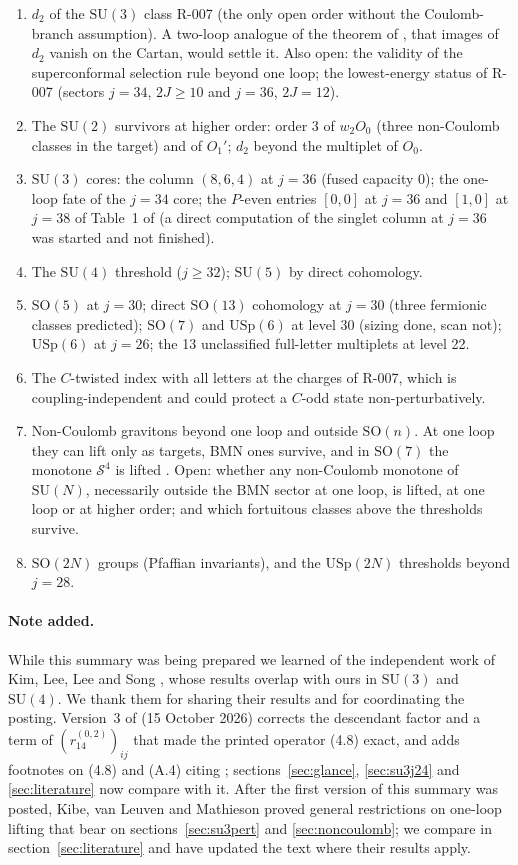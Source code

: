 \documentclass[11pt]{article}
\newcommand{\SU}{\mathrm{SU}}
\newcommand{\SO}{\mathrm{SO}}
\newcommand{\USp}{\mathrm{USp}}
\begin{document}
\begin{enumerate}
\item $d_2$ of the $\SU(3)$ class R-007 (the only open order without the Coulomb-branch assumption). A two-loop
analogue of the theorem of \cite[eq.~(6.21)]{KVM}, that images of $d_2$ vanish on the Cartan, would settle it. Also open: the
validity of the superconformal selection rule beyond one loop; the lowest-energy status of R-007 (sectors $j=34$, $2J\ge10$ and
$j=36$, $2J=12$).
\item The $\SU(2)$ survivors at higher order: order 3 of $w_2O_0$ (three non-Coulomb classes in the target) and of
$O_1'$; $d_2$ beyond the multiplet of $O_0$.
\item $\SU(3)$ cores: the column $(8,6,4)$ at $j=36$ (fused capacity 0); the one-loop fate of the $j=34$ core; the
$P$-even entries $[0,0]$ at $j=36$ and $[1,0]$ at $j=38$ of Table~1 of \cite{CCKLL} (a direct computation of the
singlet column at $j=36$ was started and not finished).
\item The $\SU(4)$ threshold ($j\ge32$); $\SU(5)$ by direct cohomology.
\item $\SO(5)$ at $j=30$; direct $\SO(13)$ cohomology at $j=30$ (three fermionic classes predicted); $\SO(7)$ and
$\USp(6)$ at level 30 (sizing done, scan not); $\USp(6)$ at $j=26$; the 13 unclassified full-letter multiplets at
level 22.
\item The $C$-twisted index with all letters at the charges of R-007, which is coupling-independent and could protect a
$C$-odd state non-perturbatively.
\item Non-Coulomb gravitons beyond one loop and outside $\SO(n)$. At one loop they can lift only as targets, BMN
ones survive, and in $\SO(7)$ the monotone $\mathcal S^4$ is lifted \cite[secs.~5--6]{KVM}. Open: whether any non-Coulomb monotone
of $\SU(N)$, necessarily outside the BMN sector at one loop, is lifted, at one loop or at higher order; and which
fortuitous classes above the thresholds survive.
\item $\SO(2N)$ groups (Pfaffian invariants), and the $\USp(2N)$ thresholds beyond $j=28$.
\end{enumerate}

\paragraph{Note added.} While this summary was being prepared we learned of the independent work of Kim, Lee, Lee and
Song \cite{KLLS}, whose results overlap with ours in $\SU(3)$ and $\SU(4)$. We thank them for sharing their results
and for coordinating the posting. Version~3 of \cite{CCKLL} (15 October 2026) corrects the descendant factor and a term of
$(r_{14}^{(0,2)})_{ij}$ that made the printed operator (4.8) exact, and adds footnotes on (4.8) and (A.4) citing
\cite{KLLS}; sections~\ref{sec:glance}, \ref{sec:su3j24} and \ref{sec:literature} now compare with it. After the
first version of this summary was posted, Kibe, van Leuven and
Mathieson \cite{KVM} proved general restrictions on one-loop lifting that bear on sections~\ref{sec:su3pert} and
\ref{sec:noncoulomb}; we compare in section~\ref{sec:literature} and have updated the text where their results
apply.
\end{document}
